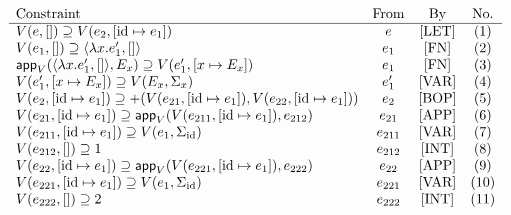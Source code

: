 \documentclass{article}
\begin{document}
\[
  \begin{array}{l c c c}
    \text{Constraint} & \text{From} & \text{By} & \text{No.}\\
    \hline
    V(e,[]) \supseteq V(e_{2},[\text{id} \mapsto e_{1}]) & e & \text{[LET]} & (1)\\
    V(e_{1},[])\supseteq \langle \lambda x.e_{1}' , [] \rangle & e_{1} & \text{[FN]} & (2)\\
    \mathsf{app}_{V}(\langle \lambda x.e_{1}', [] \rangle, E_{x}) \supseteq V(e_{1}',[x\mapsto E_{x}]) & e_{1} & \text{[FN]} & (3)\\
    V(e_{1}',[x \mapsto E_{x}]) \supseteq V(E_{x},\Sigma_{x}) & e_{1}' & \text{[VAR]} & (4)\\
    V(e_{2},[\text{id}\mapsto e_{1}]) \supseteq +(V(e_{21},[\text{id}\mapsto e_{1}]), V(e_{22},[\text{id}\mapsto e_{1}])) & e_{2} & \text{[BOP]} & (5)\\
    V(e_{21},[\text{id}\mapsto e_{1}]) \supseteq \mathsf{app}_{V}(V(e_{211},[\text{id}\mapsto e_{1}]),e_{212}) & e_{21} & \text{[APP]} & (6)\\
    V(e_{211},[\text{id}\mapsto e_{1}]) \supseteq V(e_{1},\Sigma_{\text{id}}) & e_{211} & \text{[VAR]} & (7)\\
    V(e_{212},[]) \supseteq 1 & e_{212} & \text{[INT]} & (8)\\
    V(e_{22},[\text{id}\mapsto e_{1}]) \supseteq \mathsf{app}_{V}(V(e_{221},[\text{id}\mapsto e_{1}]),e_{222}) & e_{22} & \text{[APP]} & (9)\\
    V(e_{221},[\text{id}\mapsto e_{1}]) \supseteq V(e_{1},\Sigma_{\text{id}}) & e_{221} & \text{[VAR]} & (10)\\
    V(e_{222},[]) \supseteq 2 & e_{222} & \text{[INT]} & (11)
  \end{array}
\]
\end{document}
